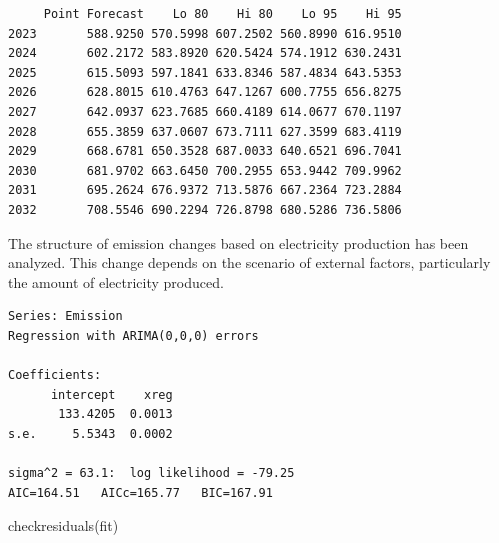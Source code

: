 \documentclass[
  letterpaper,
  DIV=11,
  numbers=noendperiod]{scrartcl}
\newenvironment{Shaded}{\begin{snugshade}}{\end{snugshade}}
\newcommand{\AttributeTok}[1]{\textcolor[rgb]{0.40,0.45,0.13}{#1}}
\newcommand{\DecValTok}[1]{\textcolor[rgb]{0.68,0.00,0.00}{#1}}
\newcommand{\FunctionTok}[1]{\textcolor[rgb]{0.28,0.35,0.67}{#1}}
\newcommand{\NormalTok}[1]{\textcolor[rgb]{0.00,0.23,0.31}{#1}}
\newcommand{\OtherTok}[1]{\textcolor[rgb]{0.00,0.23,0.31}{#1}}
\newcommand{\SpecialCharTok}[1]{\textcolor[rgb]{0.37,0.37,0.37}{#1}}
\newcommand{\StringTok}[1]{\textcolor[rgb]{0.13,0.47,0.30}{#1}}
\begin{document}
\begin{verbatim}
     Point Forecast    Lo 80    Hi 80    Lo 95    Hi 95
2023       588.9250 570.5998 607.2502 560.8990 616.9510
2024       602.2172 583.8920 620.5424 574.1912 630.2431
2025       615.5093 597.1841 633.8346 587.4834 643.5353
2026       628.8015 610.4763 647.1267 600.7755 656.8275
2027       642.0937 623.7685 660.4189 614.0677 670.1197
2028       655.3859 637.0607 673.7111 627.3599 683.4119
2029       668.6781 650.3528 687.0033 640.6521 696.7041
2030       681.9702 663.6450 700.2955 653.9442 709.9962
2031       695.2624 676.9372 713.5876 667.2364 723.2884
2032       708.5546 690.2294 726.8798 680.5286 736.5806
\end{verbatim}

The structure of emission changes based on electricity production has
been analyzed. This change depends on the scenario of external factors,
particularly the amount of electricity produced.

\begin{Shaded}
\end{Shaded}

\begin{verbatim}
Series: Emission 
Regression with ARIMA(0,0,0) errors 

Coefficients:
      intercept    xreg
       133.4205  0.0013
s.e.     5.5343  0.0002

sigma^2 = 63.1:  log likelihood = -79.25
AIC=164.51   AICc=165.77   BIC=167.91
\end{verbatim}

\begin{Shaded}
\begin{Highlighting}[]
\FunctionTok{checkresiduals}\NormalTok{(fit)}
\end{Highlighting}
\end{Shaded}
\end{document}
